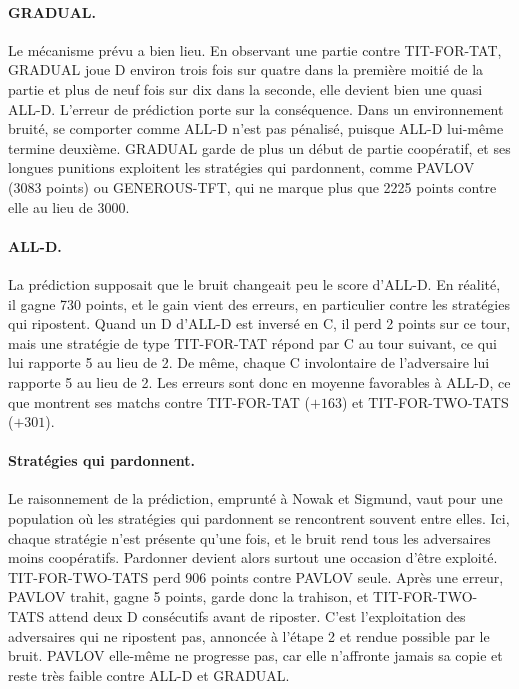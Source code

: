 \documentclass[11pt,a4paper]{article}
\begin{document}
\paragraph{GRADUAL.} Le mécanisme prévu a bien lieu. En observant une partie contre TIT-FOR-TAT, GRADUAL joue D environ trois
fois sur quatre dans la première moitié de la partie et plus de neuf fois sur dix dans la seconde, elle devient bien une
quasi ALL-D. L'erreur de prédiction porte sur la conséquence. Dans un environnement bruité, se comporter comme ALL-D n'est pas
pénalisé, puisque ALL-D lui-même termine deuxième. GRADUAL garde de plus un début de partie coopératif, et ses longues
punitions exploitent les stratégies qui pardonnent, comme PAVLOV (3083 points) ou GENEROUS-TFT, qui ne marque plus que 2225
points contre elle au lieu de 3000.

\paragraph{ALL-D.} La prédiction supposait que le bruit changeait peu le score d'ALL-D. En réalité, il gagne 730 points, et le
gain vient des erreurs, en particulier contre les stratégies qui ripostent. Quand un D d'ALL-D est inversé en C, il perd
2 points sur ce tour, mais une stratégie de type TIT-FOR-TAT répond par C au tour suivant, ce qui lui rapporte 5 au lieu de 2.
De même, chaque C involontaire de l'adversaire lui rapporte 5 au lieu de 2. Les erreurs sont donc en moyenne favorables à
ALL-D, ce que montrent ses matchs contre TIT-FOR-TAT ($+163$) et TIT-FOR-TWO-TATS ($+301$).

\paragraph{Stratégies qui pardonnent.} Le raisonnement de la prédiction, emprunté à Nowak et Sigmund, vaut pour une population
où les stratégies qui pardonnent se rencontrent souvent entre elles. Ici, chaque stratégie n'est présente qu'une fois, et le
bruit rend tous les adversaires moins coopératifs. Pardonner devient alors surtout une occasion d'être exploité.
TIT-FOR-TWO-TATS perd 906 points contre PAVLOV seule. Après une erreur, PAVLOV trahit, gagne 5 points, garde donc la trahison,
et TIT-FOR-TWO-TATS attend deux D consécutifs avant de riposter. C'est l'exploitation des adversaires qui ne ripostent pas,
annoncée à l'étape 2 et rendue possible par le bruit. PAVLOV elle-même ne progresse pas, car elle n'affronte jamais sa copie et
reste très faible contre ALL-D et GRADUAL.
\end{document}
